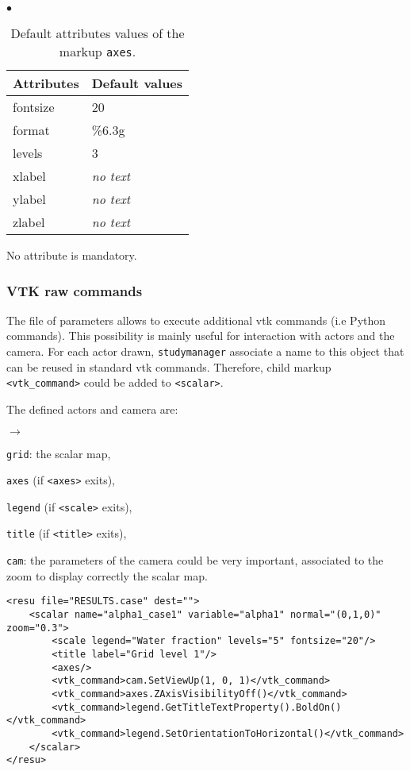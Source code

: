 \documentclass[a4paper,10pt,twoside]{csshortdoc}
\begin{document}
\begin{list}{$\bullet$}{}
\begin{table}[htbp]
\begin{center}
\begin{tabular}{|l|l|}
\hline
\textbf{Attributes} & \textbf{Default values} \\
\hline
fontsize & 20 \\
format & \%6.3g \\
levels & 3 \\
xlabel & \textit{no text} \\
ylabel & \textit{no text} \\
zlabel & \textit{no text} \\
\hline
\end{tabular}
\end{center}
\caption{Default attributes values of the markup \texttt{axes}.}
\label{table:axes}
\end{table}

No attribute is mandatory.

\end{list}

\subsubsection{VTK raw commands}\label{sec:raw_vtk}

The file of parameters allows to execute additional vtk commands (i.e Python
commands). This possibility is mainly useful for interaction with actors and the
camera. For each actor drawn, \texttt{studymanager} associate a name to this object
that can be reused in standard vtk commands. Therefore, child markup
\texttt{<vtk\_command>} could be added to \texttt{<scalar>}.

The defined actors and camera are:
\begin{list}{$\rightarrow$}{}
\item \texttt{grid}: the scalar map,
\item \texttt{axes} (if \texttt{<axes>} exits),
\item \texttt{legend} (if \texttt{<scale>} exits),
\item \texttt{title} (if \texttt{<title>} exits),
\item \texttt{cam}: the parameters of the camera could be very important,
associated to the zoom to display correctly the scalar map.
\end{list}

\small
\begin{verbatim}
<resu file="RESULTS.case" dest="">
    <scalar name="alpha1_case1" variable="alpha1" normal="(0,1,0)" zoom="0.3">
        <scale legend="Water fraction" levels="5" fontsize="20"/>
        <title label="Grid level 1"/>
        <axes/>
        <vtk_command>cam.SetViewUp(1, 0, 1)</vtk_command>
        <vtk_command>axes.ZAxisVisibilityOff()</vtk_command>
        <vtk_command>legend.GetTitleTextProperty().BoldOn()</vtk_command>
        <vtk_command>legend.SetOrientationToHorizontal()</vtk_command>
    </scalar>
</resu>
\end{verbatim}
\normalsize
\end{document}
